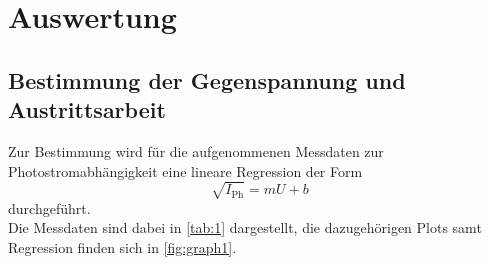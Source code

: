 \section{Auswertung}
\label{sec:auswertung}

\subsection{Bestimmung der Gegenspannung und Austrittsarbeit}

Zur Bestimmung wird für die aufgenommenen Messdaten zur Photostromabhängigkeit eine lineare Regression der Form
\begin{equation*}
    \sqrt{I_\text{Ph}} = m U + b
\end{equation*}
durchgeführt. \\

Die Messdaten sind dabei in \autoref{tab:1} dargestellt, die dazugehörigen Plots samt Regression finden sich in \autoref{fig:graph1}.

